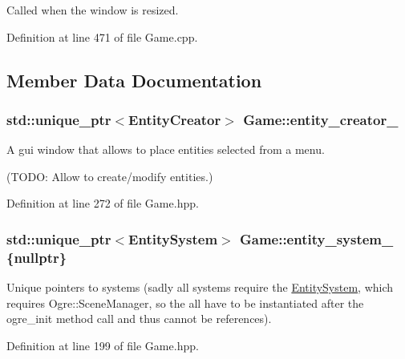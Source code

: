 Called when the window is resized. 



Definition at line 471 of file Game.\+cpp.



\subsection{Member Data Documentation}
\subsubsection[{\texorpdfstring{entity\+\_\+creator\+\_\+}{entity_creator_}}]{\setlength{\rightskip}{0pt plus 5cm}std\+::unique\+\_\+ptr$<${\bf Entity\+Creator}$>$ Game\+::entity\+\_\+creator\+\_\+\hspace{0.3cm}{\ttfamily [private]}}\hypertarget{class_game_ad5a3e4b03b13386ab6dd759017573821}{}\label{class_game_ad5a3e4b03b13386ab6dd759017573821}


A gui window that allows to place entities selected from a menu. 

(T\+O\+DO\+: Allow to create/modify entities.) 

Definition at line 272 of file Game.\+hpp.

\subsubsection[{\texorpdfstring{entity\+\_\+system\+\_\+}{entity_system_}}]{\setlength{\rightskip}{0pt plus 5cm}std\+::unique\+\_\+ptr$<${\bf Entity\+System}$>$ Game\+::entity\+\_\+system\+\_\+ \{nullptr\}\hspace{0.3cm}{\ttfamily [private]}}\hypertarget{class_game_ab64dd8e6b94e4ea96da9cba633524cdb}{}\label{class_game_ab64dd8e6b94e4ea96da9cba633524cdb}


Unique pointers to systems (sadly all systems require the \hyperlink{class_entity_system}{Entity\+System}, which requires Ogre\+::\+Scene\+Manager, so the all have to be instantiated after the ogre\+\_\+init method call and thus cannot be references). 



Definition at line 199 of file Game.\+hpp.

